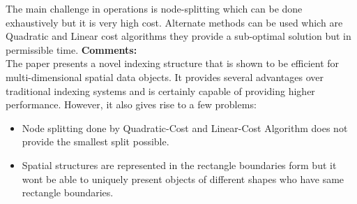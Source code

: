 \documentclass[a4paper,12pt, twoside]{article}
\begin{document}
The main challenge in operations is node-splitting which can be done exhaustively but it is very high cost. Alternate methods can be used which are Quadratic and Linear cost algorithms they provide a sub-optimal solution but in permissible time.
\textbf{Comments:}\\
The paper presents a novel indexing structure that is shown to be efficient for multi-dimensional spatial data objects. It provides several advantages over traditional indexing systems and is certainly capable of providing higher performance. However, it also gives rise to a few problems:
\begin{itemize}
	\item Node splitting done by Quadratic-Cost and Linear-Cost Algorithm does not provide the smallest split possible.
	
	\item Spatial structures are represented in the rectangle boundaries form but it wont be able to uniquely present objects of different shapes who have same rectangle boundaries.
\end{itemize}
\end{document}
